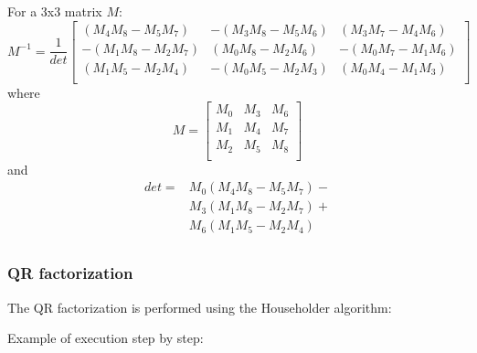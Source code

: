 For a 3x3 matrix $M$:\\

\begin{equation}
M^{-1}=\frac{1}{det}\left[\begin{array}{ccc}
(M_4M_8-M_5M_7)&-(M_3M_8-M_5M_6)&(M_3M_7-M_4M_6)\\
-(M_1M_8-M_2M_7)&(M_0M_8-M_2M_6)&-(M_0M_7-M_1M_6)\\
(M_1M_5-M_2M_4)&-(M_0M_5-M_2M_3)&(M_0M_4-M_1M_3)\\
\end{array}\right]
\end{equation}
where
\begin{equation}
M=\left[\begin{array}{ccc}
M_0&M_3&M_6\\
M_1&M_4&M_7\\
M_2&M_5&M_8\\
\end{array}\right]
\end{equation}
and
\begin{equation}
\begin{array}{ll}
det=&M_0(M_4M_8-M_5M_7)-\\
&M_3(M_1M_8-M_2M_7)+\\
&M_6(M_1M_5-M_2M_4)\\
\end{array}
\end{equation}

\subsubsection{QR factorization}

The QR factorization is performed using the Householder algorithm:\\

\begin{scriptsize}
\begin{ttfamily}

\end{ttfamily}
\end{scriptsize}

Example of execution step by step:\\

\begin{scriptsize}
\begin{ttfamily}

\end{ttfamily}
\end{scriptsize}

